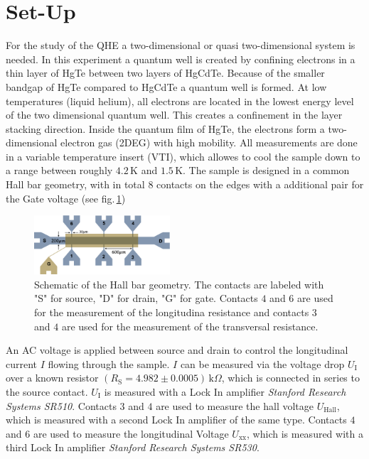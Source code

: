 \section{Set-Up}
For the study of the QHE a two-dimensional or quasi two-dimensional system is needed.
In this experiment a quantum well is created by confining electrons in a thin layer of HgTe between
two layers of HgCdTe. Because of the smaller bandgap of HgTe compared to HgCdTe a quantum well is formed. 
At low temperatures (liquid helium), all electrons are located in the lowest energy level of the 
two dimensional quantum well. This creates a confinement in the layer stacking direction.
Inside the quantum film of HgTe, the electrons form a two-dimensional electron gas (2DEG) with high mobility.
All measurements are done in a variable temperature insert (VTI), which allowes to cool the sample down to a
range between roughly $4.2\,\text{K}$ and $1.5\,\text{K}$. The sample is designed in a common Hall bar geometry,
with in total $8$ contacts on the edges with a additional pair for the Gate voltage (see fig.\,\ref{fig:HallBar})
\begin{figure}[h]
    \centering
    \includegraphics[width=0.45\textwidth]{../Images/HallBar.png}
    \caption{Schematic of the Hall bar geometry. The contacts are labeled with "S" for source, "D" for drain,
    "G" for gate. Contacts $4$ and $6$ are used for the measurement of the longitudina resistance 
    and contacts $3$ and $4$ are used for the measurement of the transversal resistance.}
    \label{fig:HallBar}
\end{figure}
An AC voltage is applied between source and drain to control the longitudinal current $I$
flowing through the sample. $I$ can be measured via the voltage drop $U_\text{I}$ over a known resistor $(R_\text{S}=4.982\pm0.0005)\,\text{k}\Omega$, 
which is connected in series to the source contact. $U_\text{I}$ is measured with a Lock In amplifier 
\emph{Stanford Research Systems SR510}. Contacts $3$ and $4$ are used to measure the hall voltage $U_\text{Hall}$, which
is measured with a second Lock In amplifier of the same type. Contacts $4$ and $6$ are used to measure
the longitudinal Voltage $U_\text{xx}$, which is measured with a third Lock In amplifier \emph{Stanford Research Systems SR530}.
